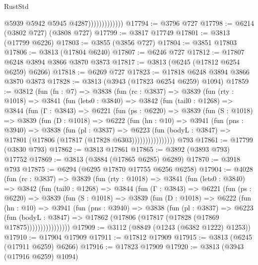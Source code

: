 \begin{lexlean}{RustStd}
\begin{coremodule}
{\begin{coremodule}
{{{{{{{{{{{{{{{{{{{{{{{{{{{{{{{{{{{                              @5939
                              @5942
                              @5945
                              @4287)))))))))))))
@17794 := @3796 @727
@17798 := @6214 (@3802 @727) (@3808 @727)
@17799 := @3817 @17749
@17801 := @3813 (@17799 @6226)
@17803 := @3855 (@3856 @727)
@17804 := @3851 @17803
@17806 := @3813 (@17804 @6240)
@17807 := @6246 @727
@17812 := @17807 @6248 @3894 @3866 @3870 @3873
@17817 := @3813 (@6245 (@17812 @6254 @6259) @6266)
@17818 := @6269 @727
@17823 := @17818 @6248 @3894 @3866 @3870 @3873
@17828 := @3813 (@3943 (@17823 @6254 @6259) @1094)
@17859 := @3812
    (fun (fn : @7) =>
    @3838
      (fun (rc : @3837) =>
      @3839
        (fun (rty : @1018) =>
        @3841
          (fun (lets0 : @3840) =>
          @3842
            (fun (tail0 : @1268) =>
            @3844
              (fun (Γ : @3843) =>
              @6221
                (fun (ps : @6220) =>
                @3839
                  (fun (S : @1018) =>
                  @3839
                    (fun (D : @1018) =>
                    @6222
                      (fun (hn : @10) =>
                      @3941
                        (fun (pns : @3940) =>
                        @3838
                          (fun (pl : @3837) =>
                          @6223
                            (fun (bodyL : @3847) =>
                            @17801 (@17806 (@17817 (@17828 @6303))))))))))))))))
    @793
@17861 := @17799 (@3830 @793)
@17862 := @3813 @17861
@17865 := @3892 (@3893 @793) @17752
@17869 := @3813 (@3884 (@17865 @6285) @6289)
@17870 := @3918 @793
@17875 := @6294 (@6295 @17870 @17755 @6256 @6258)
@17904 := @4028
    (fun (rc : @3837) =>
    @3839
      (fun (rty : @1018) =>
      @3841
        (fun (lets0 : @3840) =>
        @3842
          (fun (tail0 : @1268) =>
          @3844
            (fun (Γ : @3843) =>
            @6221
              (fun (ps : @6220) =>
              @3839
                (fun (S : @1018) =>
                @3839
                  (fun (D : @1018) =>
                  @6222
                    (fun (hn : @10) =>
                    @3941
                      (fun (pns : @3940) =>
                      @3838
                        (fun (pl : @3837) =>
                        @6223
                          (fun (bodyL : @3847) =>
                          @17862 (@17806 (@17817 (@17828 (@17869 @17875))))))))))))))))
@17909 := @3112 (@8849 (@1243 (@6382 @1222) @1253))
@17910 := @17904 @17909
@17911 := @17812 @17909
@17915 := @3813 (@6245 (@17911 @6259) @6266)
@17916 := @17823 @17909
@17920 := @3813 (@3943 (@17916 @6259) @1094)
}}}}}}}}}}}}}}}}}}}}}}}}}}}}}}}}}}}
\end{coremodule}}
\end{coremodule}
\end{lexlean}
